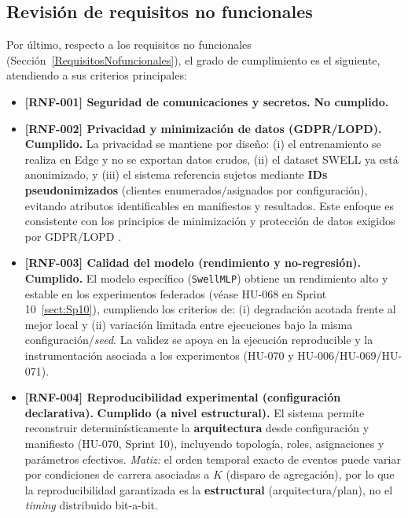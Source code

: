 \documentclass{report}
\begin{document}
\subsection{Revisión de requisitos no funcionales}
\label{sec:revision_rnf}

Por último, respecto a los requisitos no funcionales (Sección~\ref{RequisitosNofuncionales}), el grado de cumplimiento es el siguiente, atendiendo a sus criterios principales:

\begin{itemize}\setlength\itemsep{0.35em}

  \item \textbf{[RNF-001] Seguridad de comunicaciones y secretos.} \textbf{No cumplido.}  

  \item \textbf{[RNF-002] Privacidad y minimización de datos (GDPR/LOPD).} \textbf{Cumplido.}  
  La privacidad se mantiene por diseño: (i) el entrenamiento se realiza en Edge y no se exportan datos crudos, (ii) el dataset SWELL ya está anonimizado, y (iii) el sistema referencia sujetos mediante \textbf{IDs pseudonimizados} (clientes enumerados/asignados por configuración), evitando atributos identificables en manifiestos y resultados. Este enfoque es consistente con los principios de minimización y protección de datos exigidos por GDPR/LOPD \cite{gdpr2016,lopdgdd2018}.

  \item \textbf{[RNF-003] Calidad del modelo (rendimiento y no-regresión).} \textbf{Cumplido.}  
  El modelo específico (\texttt{SwellMLP}) obtiene un rendimiento alto y estable en los experimentos federados (véase HU-068 en Sprint 10~\ref{sect:Sp10}), cumpliendo los criterios de: (i) degradación acotada frente al mejor local y (ii) variación limitada entre ejecuciones bajo la misma configuración/\textit{seed}. La validez se apoya en la ejecución reproducible y la instrumentación asociada a los experimentos (HU-070 y HU-006/HU-069/HU-071).

  \item \textbf{[RNF-004] Reproducibilidad experimental (configuración declarativa).} \textbf{Cumplido (a nivel estructural).}  
  El sistema permite reconstruir determinísticamente la \textbf{arquitectura} desde configuración y manifiesto (HU-070, Sprint 10), incluyendo topología, roles, asignaciones y parámetros efectivos.  
  \textit{Matiz:} el orden temporal exacto de eventos puede variar por condiciones de carrera asociadas a $K$ (disparo de agregación), por lo que la reproducibilidad garantizada es la \textbf{estructural} (arquitectura/plan), no el \textit{timing} distribuido bit-a-bit.


\end{itemize}
\end{document}
